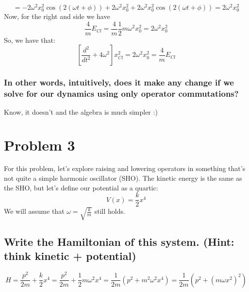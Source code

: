 \documentclass[12pt]{article}
\begin{document}
\begin{equation}
    = -2\omega^{2}x_{0}^{2}\cos(2(\omega t + \phi)) + 2\omega^{2} x_{0}^{2} + 2\omega^{2} x_{0}^{2}\cos(2(\omega t + \phi)) = 2\omega^{2} x_{0}^{2}
\end{equation}
Now, for the right and side we have
\begin{equation}
    \frac{4}{m} E_{Cl} = \frac{4}{m}\frac{1}{2} m\omega^{2}x_{0}^{2} = 2\omega^{2} x_{0}^{2}
\end{equation}
So, we have that:
\begin{equation}
    \boxed{\left[ \frac{d^2}{dt^2} + 4\omega^2 \right] x_{Cl}^2 = 2\omega^{2} x_{0}^{2} =  \frac{4}{m} E_{Cl}}
\end{equation}
\subsubsection{In other words, intuitively, does it make any change if we solve for our dynamics using only operator commutations?}
Know, it doesn't and the algebra is much simpler :)

\section{Problem 3}

For this problem, let’s explore raising and lowering operators in something that’s not quite a simple harmonic oscillator (SHO). The kinetic energy is the same as the SHO, but let’s define our potential as a quartic: 
\[ V(x) = \frac{k}{2}x^4 \]
We will assume that \( \omega = \sqrt{\frac{k}{m}} \) still holds.

\subsection{Write the Hamiltonian of this system. (Hint: think kinetic + potential)}
\begin{equation}
    H = \frac{p^2}{2m} + \frac{k}{2}x^4 = \frac{p^2}{2m} + \frac{1}{2}m \omega ^{2}x^{4}= \frac{1}{2m} \left(p^{2} + m^{2}\omega^{2}x^{4}\right)= \frac{1}{2m} \left(p^{2} + \left(m \omega x^{2}\right)^{2}\right)
\end{equation}
\end{document}
